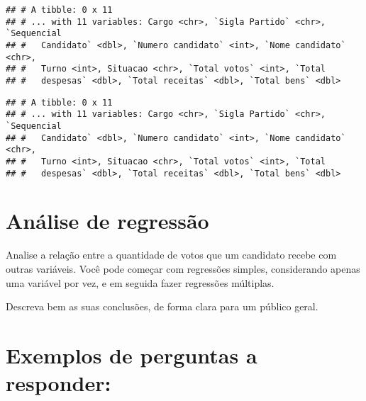 \documentclass[]{article}
\newenvironment{Shaded}{\begin{snugshade}}{\end{snugshade}}
\newcommand{\KeywordTok}[1]{\textcolor[rgb]{0.13,0.29,0.53}{\textbf{#1}}}
\newcommand{\DataTypeTok}[1]{\textcolor[rgb]{0.13,0.29,0.53}{#1}}
\newcommand{\DecValTok}[1]{\textcolor[rgb]{0.00,0.00,0.81}{#1}}
\newcommand{\StringTok}[1]{\textcolor[rgb]{0.31,0.60,0.02}{#1}}
\newcommand{\OperatorTok}[1]{\textcolor[rgb]{0.81,0.36,0.00}{\textbf{#1}}}
\newcommand{\NormalTok}[1]{#1}
\begin{document}
\begin{Shaded}
\end{Shaded}

\begin{verbatim}
## # A tibble: 0 x 11
## # ... with 11 variables: Cargo <chr>, `Sigla Partido` <chr>, `Sequencial
## #   Candidato` <dbl>, `Numero candidato` <int>, `Nome candidato` <chr>,
## #   Turno <int>, Situacao <chr>, `Total votos` <int>, `Total
## #   despesas` <dbl>, `Total receitas` <dbl>, `Total bens` <dbl>
\end{verbatim}

\begin{Shaded}
\end{Shaded}

\begin{verbatim}
## # A tibble: 0 x 11
## # ... with 11 variables: Cargo <chr>, `Sigla Partido` <chr>, `Sequencial
## #   Candidato` <dbl>, `Numero candidato` <int>, `Nome candidato` <chr>,
## #   Turno <int>, Situacao <chr>, `Total votos` <int>, `Total
## #   despesas` <dbl>, `Total receitas` <dbl>, `Total bens` <dbl>
\end{verbatim}

\section{Análise de regressão}\label{analise-de-regressao}

Analise a relação entre a quantidade de votos que um candidato recebe
com outras variáveis. Você pode começar com regressões simples,
considerando apenas uma variável por vez, e em seguida fazer regressões
múltiplas.

Descreva bem as suas conclusões, de forma clara para um público geral.

\section{Exemplos de perguntas a
responder:}\label{exemplos-de-perguntas-a-responder}
\end{document}
